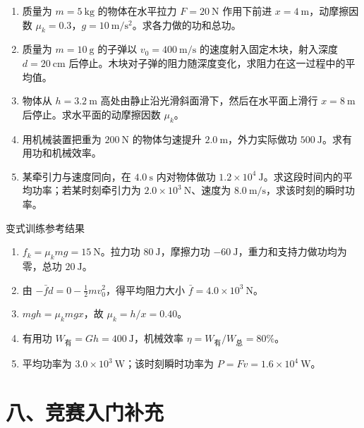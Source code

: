 \begin{enumerate}
  \item 质量为 $m = 5\ \mathrm{kg}$ 的物体在水平拉力 $F = 20\ \mathrm{N}$ 作用下前进 $x = 4\ \mathrm{m}$，动摩擦因数 $\mu_k = 0.3$，$g = 10\ \mathrm{m/s^2}$。求各力做的功和总功。

  \item 质量为 $m = 10\ \mathrm{g}$ 的子弹以 $v_0 = 400\ \mathrm{m/s}$ 的速度射入固定木块，射入深度 $d = 20\ \mathrm{cm}$ 后停止。木块对子弹的阻力随深度变化，求阻力在这一过程中的平均值。

  \item 物体从 $h = 3.2\ \mathrm{m}$ 高处由静止沿光滑斜面滑下，然后在水平面上滑行 $x = 8\ \mathrm{m}$ 后停止。求水平面的动摩擦因数 $\mu_k$。
  \begin{center}
  
  \end{center}

  \item 用机械装置把重为 $200\ \mathrm{N}$ 的物体匀速提升 $2.0\ \mathrm{m}$，外力实际做功 $500\ \mathrm{J}$。求有用功和机械效率。

  \item 某牵引力与速度同向，在 $4.0\ \mathrm{s}$ 内对物体做功
  $1.2\times10^4\ \mathrm{J}$。求这段时间内的平均功率；若某时刻牵引力为
  $2.0\times10^3\ \mathrm{N}$、速度为 $8.0\ \mathrm{m/s}$，求该时刻的瞬时功率。
\end{enumerate}

\begin{learningbox}{变式训练参考结果}
\begin{enumerate}[itemsep=0.45em,topsep=0.3em,parsep=0pt]
  \item $f_k=\mu_kmg=15\ \mathrm N$。拉力功 $80\ \mathrm J$，摩擦力功 $-60\ \mathrm J$，重力和支持力做功均为零，总功 $20\ \mathrm J$。
  \item 由 $-\bar f d=0-\frac12mv_0^2$，得平均阻力大小
  $\bar f=4.0\times10^3\ \mathrm N$。
  \item $mgh=\mu_kmgx$，故 $\mu_k=h/x=0.40$。
  \item 有用功 $W_{\text{有}}=Gh=400\ \mathrm J$，机械效率
  $\eta=W_{\text{有}}/W_{\text{总}}=80\%$。
  \item 平均功率为 $3.0\times10^3\ \mathrm W$；该时刻瞬时功率为
  $P=Fv=1.6\times10^4\ \mathrm W$。
\end{enumerate}
\end{learningbox}

\section*{八、竞赛入门补充}

